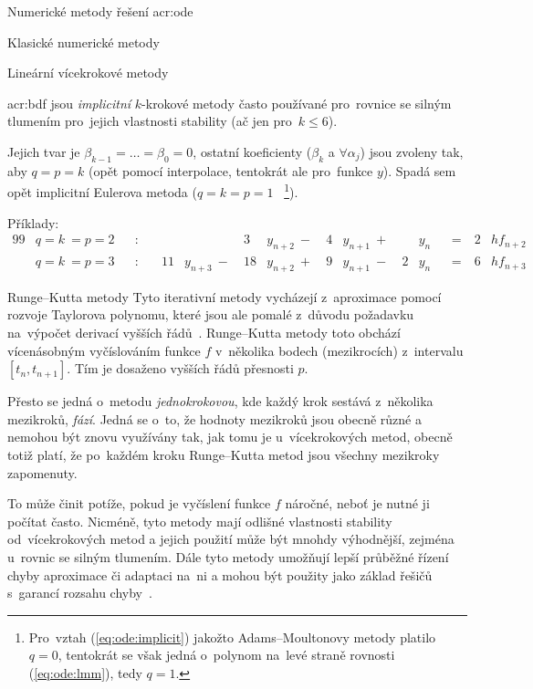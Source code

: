 \documentclass[thesis=M,czech]{FITthesis}[2012/06/26]
\newcommand{\acrlabel}[1]{acr:#1}
\newcommand{\acr}[1]{\acrshort{\acrlabel{#1}}}
\newcommand{\acrf}[1]{\acrfull{\acrlabel{#1}}}
\newcommand{\hl}[1]{\textit{#1}}
\newcommand{\name}[1]{\hl{#1}}
\newcommand{\cit}[1]{\cite{#1}}
\newcommand{\rf}[1]{\ref{#1}}
\newcommand{\rfeq}[1]{(\rf{eq:#1})}
\begin{document}
\begin{section}{Numerické metody řešení \acr{ode}}
\begin{subsection}{Klasické numerické metody}
\begin{subsubsection}{Lineární vícekrokové metody}

\begin{paragraph}{\acrf{bdf}}\label{p:search:ode:classic:lmm:bdf}
jsou \hl{implicitní} $k$-krokové metody často používané
pro~rovnice se silným tlumením
pro~jejich vlastnosti stability
(ač jen pro~${k \leq 6}$).

Jejich tvar je
${\beta_{k-1} = \dots} = {\beta_{0} = 0}$,
ostatní koeficienty ($\beta_{k}$ a ${\forall \alpha_{j}}$)
jsou zvoleny tak, aby ${q = p = k}$
(opět pomocí interpolace,
tentokrát ale pro~funkce $y$).
Spadá sem opět implicitní Eulerova metoda
(${q = k = p = 1}$~%
\footnote{Pro~vztah \rfeq{ode:implicit}
jakožto Adams--Moultonovy metody platilo ${q = 0}$,
tentokrát se však jedná o~polynom na~levé straně rovnosti \rfeq{ode:lmm},
tedy ${q = 1}$.}).

Příklady:
\begin{alignat*}{99}
   &q = k~= p = 2&&: \quad &    &               &  3 & y_{n+2} \:-\:
      & 4 & y_{n+1} \:+\: &   & y_{n} &&= \: & 2 & h f_{n+2} \\
   &q = k~= p = 3&&: \quad & 11 & y_{n+3} \:-\: & 18 & y_{n+2} \:+\:
      & 9 & y_{n+1} \:-\: & 2 & y_{n} &&= \: & 6 & h f_{n+3}
\end{alignat*}
\end{paragraph} %


\end{subsubsection} %


\begin{subsubsection}{Runge--Kutta metody}\label{sss:search:ode:classic:rk}
Tyto iterativní metody vycházejí z~aproximace
pomocí rozvoje Taylorova polynomu,
které jsou ale pomalé z~důvodu požadavku
na~výpočet derivací vyšších řádů~\cit{ode-nsolve-book}.
Runge--Kutta metody toto obchází
vícenásobným vyčíslováním funkce $f$
v~několika bodech (mezikrocích)
z~intervalu $[t_{n}, t_{n+1}]$.
Tím je dosaženo vyšších řádů přesnosti $p$.

Přesto se jedná o~metodu \hl{jednokrokovou},
kde každý krok sestává z~několika mezikroků, \name{fází}.
Jedná se o~to,
že hodnoty mezikroků jsou obecně různé
a nemohou být znovu využívány tak,
jak tomu je u~vícekrokových metod,
obecně totiž platí,
že po~každém kroku Runge--Kutta metod
jsou všechny mezikroky zapomenuty.

To může činit potíže,
pokud je vyčíslení funkce $f$ náročné,
neboť je nutné ji počítat často.
Nicméně, tyto metody
mají odlišné vlastnosti stability
od~vícekrokových metod
a jejich použití může být mnohdy výhodnější,
zejména u~rovnic se silným tlumením.
Dále tyto metody umožňují lepší průběžné řízení chyby aproximace
či adaptaci na~ni
a mohou být použity jako základ
řešičů s~garancí rozsahu chyby~\cit{ode-valid-runge_kutta-art}.


\end{subsubsection}
\end{subsection}
\end{section}
\end{document}
